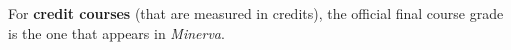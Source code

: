 For {\bf credit courses} (that are measured in credits), the official
final course grade is the one that appears in {\em Minerva}.
